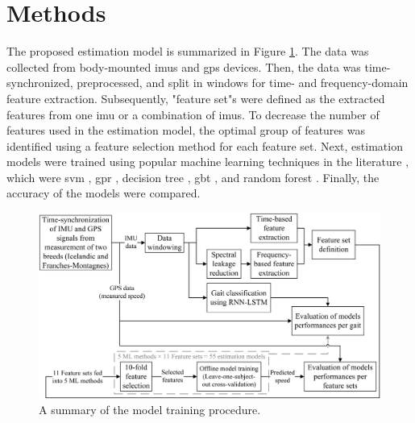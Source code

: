 \section{Methods}
\label{sec:methods}


The proposed estimation model is summarized in Figure \ref{speed_system}. The data was collected from body-mounted \gls{imu}s and \gls{gps} devices. Then, the data was time-synchronized, preprocessed, and split in windows for time- and frequency-domain feature extraction. Subsequently, "feature set"s were defined as the extracted features from one \gls{imu} or a combination of \gls{imu}s. To decrease the number of features used in the estimation model, the optimal group of features was identified using a feature selection method for each feature set. Next, estimation models were trained using popular machine learning techniques in the literature \cite{Bouwman2020,Zhou2020}, which were \gls{svm}  \cite{cortes_1995_supportvector}, \gls{gpr} \cite{carledwardrasmussen_2008_gaussian}, decision tree \cite{quinlan_1986_induction}, \gls{gbt} \cite{friedman_2002_stochastic,SUT201115534}, and random forest \cite{breiman_2001_random}. Finally, the accuracy of the models were compared.

\begin{figure}[htbp]
\centering
\includegraphics[width=\linewidth]{chapters/Speed/figures/Untitled_HQ.png}
\caption{A summary of the model training procedure.}
\label{speed_system}
\end{figure}

